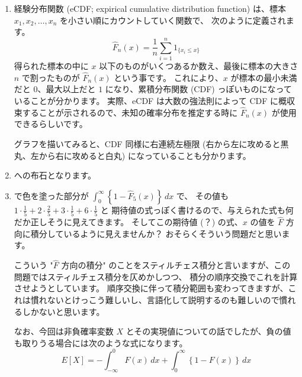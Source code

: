 \documentclass[./main.tex]{subfiles}
\begin{document}
    \begin{enumerate}
        \item 経験分布関数 (eCDF; expirical cumulative distribution function) は、標本 $x_1, x_2, \dots, x_n$ を小さい順にカウントしていく関数で、
        次のように定義されます。
        \begin{equation}
            \hat{F}_n (x)
                = \frac{1}{n} \sum_{i=1}^n 1_{ \{ x_i \leq x \} }
        \end{equation}
        得られた標本の中に $x$ 以下のものがいくつあるか数え、最後に標本の大きさ $n$ で割ったものが $\hat{F}_n (x)$ という事です。
        これにより、$x$ が標本の最小未満だと $0$、最大以上だと $1$ になり、累積分布関数 (CDF) っぽいものになっていることが分かります。
        実際、eCDF は大数の強法則によって CDF に概収束することが示されるので、未知の確率分布を推定する時に $\hat{F}_n (x)$ が使用できるらしいです。

        グラフを描いてみると、CDF 同様に右連続左極限 (右から左に攻めると黒丸、左から右に攻めると白丸) になっていることも分かります。


        \item \relax [3] への布石となります。
        
        \item \relax [2] で色を塗った部分が $\displaystyle \int_0^\infty \left\{ 1 - \hat{F}_5 (x) \right\} \, dx$ で、
        その値も $\displaystyle 1 \cdot \frac{1}{5} + 2 \cdot \frac{2}{5} + 3 \cdot \frac{1}{5} + 6 \cdot \frac{1}{5}$ と
        期待値の式っぽく書けるので、与えられた式も何だか正しそうに見えてきます。
        そしてこの期待値 (？) の式、$x$ の値を $\hat{F}$ 方向に積分しているように見えませんか？
        おそらくそういう問題だと思います。

        こういう "$\hat{F}$ 方向の積分" のことをスティルチェス積分と言いますが、この問題ではスティルチェス積分を仄めかしつつ、
        積分の順序交換でこれを計算させようとしています。
        順序交換に伴って積分範囲も変わってきますが、これは慣れないとけっこう難しいし、言語化して説明するのも難しいので慣れるしかないと思います。

        なお、今回は非負確率変数 $X$ とその実現値についての話でしたが、負の値も取りうる場合には次のような式になります。
        \begin{equation}
            E[X] 
                = - \int_{-\infty}^0 F(x) \,dx
                    + \int_0^\infty \left\{ 1 - F(x) \right\} \, dx
        \end{equation}



\end{enumerate}
\end{document}
